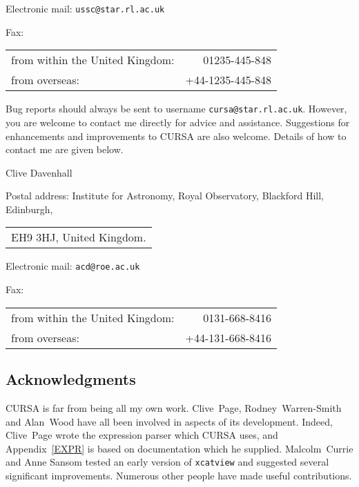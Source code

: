 \documentclass[twoside,11pt]{article}
\renewcommand{\_}{\texttt{\symbol{95}}}
\begin{document}
\vspace{3mm}

Electronic mail: {\tt ussc@star.rl.ac.uk}

\vspace{3mm}

Fax: \\
\begin{tabular}{lr}
from within the United Kingdom: &    01235-445-848 \\
from overseas:                  & +44-1235-445-848 \\
\end{tabular}

\vspace{3mm}

Bug reports should always be sent to username {\tt cursa@star.rl.ac.uk}.
However, you are welcome to contact me directly for advice and assistance.
Suggestions for enhancements and improvements to CURSA are also
welcome.  Details of how to contact me are given below.
\begin{flushright}
Clive Davenhall \\
\end{flushright}

\vspace{3mm}

Postal address: Institute for Astronomy, Royal Observatory, Blackford Hill,
Edinburgh, \\
\begin{tabular}{l}
EH9 3HJ, United Kingdom.  \\
\end{tabular}

\vspace{4mm}

Electronic mail: {\tt acd@roe.ac.uk}

\vspace{4mm}

Fax: \\
\begin{tabular}{lr}
from within the United Kingdom: &    0131-668-8416 \\
from overseas:                  & +44-131-668-8416 \\
\end{tabular}


\newpage
\subsection*{Acknowledgments}

CURSA is far from being all my own work. Clive~Page, Rodney~Warren-Smith
and Alan~Wood have all been involved in aspects of its development.
Indeed, Clive~Page wrote the expression parser which CURSA uses, and
Appendix~\ref{EXPR} is based on documentation which he supplied.
Malcolm~Currie and Anne Sansom tested an early version of {\tt xcatview}
and suggested several significant improvements. Numerous other people have
made useful contributions.
\end{document}
